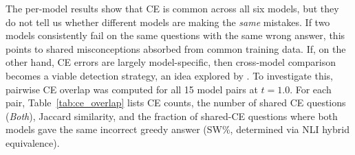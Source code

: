 \documentclass[12pt,twocolumn]{article}
\begin{document}
The per-model results show that CE is common across all six models,
but they do not tell us whether different models are making the
\emph{same} mistakes. If two models consistently fail on the same
questions with the same wrong answer, this points to shared
misconceptions absorbed from common training data. If, on the other
hand, CE errors are largely model-specific, then cross-model
comparison becomes a viable detection strategy, an idea explored
by \citet{tan2025consistent}. To investigate this, pairwise CE
overlap was computed for all 15 model pairs at $t{=}1.0$.
For each pair, Table~\ref{tab:ce_overlap} lists CE counts, the
number of shared CE questions (\emph{Both}), Jaccard similarity,
and the fraction of shared-CE questions where both models gave the
same incorrect greedy answer (SW\%, determined via NLI hybrid
equivalence).

\begin{table}[H]
\centering
{}
\caption{Pairwise CE overlap at $t{=}1.0$ (NLI hybrid). Same: same
greedy wrong answer; SW\%: Same/Both$\times$100. Totals: 720 shared
CE instances, 529 same-wrong (73.5\%).}
\label{tab:ce_overlap}
\end{table}
\end{document}
